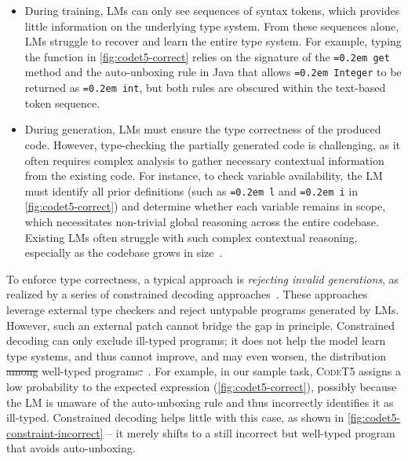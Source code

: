 \documentclass[manuscript,screen]{acmart}
\makeatletter
\newcommand{\toolname}[1]{\textsc{#1}}
\newcommand{\tcode}[1]{{\small \texttt{\spaceskip=0.2em #1}}}
\providecommand{\DIFadd}[1]{{\protect\color{blue}\uwave{#1}}} %
\providecommand{\DIFdel}[1]{{\protect\color{red}\sout{#1}}} %
\providecommand{\DIFaddbegin}{} %
\providecommand{\DIFaddend}{} %
\providecommand{\DIFdelbegin}{} %
\providecommand{\DIFdelend}{} %
\providecommand{\DIFscaledelfig}{0.5}
\newlength{\DIFdelgraphicswidth} %
\newlength{\DIFdelgraphicsheight} %
\providecommand{\DIFaddincludegraphics}[2][]{{\color{blue}\fbox{\DIFOincludegraphics[#1]{#2}}}} %
\providecommand{\DIFdelincludegraphics}[2][]{%
\sbox{\DIFdelgraphicsbox}{\DIFOincludegraphics[#1]{#2}}%
\settoboxwidth{\DIFdelgraphicswidth}{\DIFdelgraphicsbox} %
\settoboxtotalheight{\DIFdelgraphicsheight}{\DIFdelgraphicsbox} %
\scalebox{\DIFscaledelfig}{%
\parbox[b]{\DIFdelgraphicswidth}{\usebox{\DIFdelgraphicsbox}\\[-\baselineskip] \rule{\DIFdelgraphicswidth}{0em}}\llap{\resizebox{\DIFdelgraphicswidth}{\DIFdelgraphicsheight}{%
\setlength{\unitlength}{\DIFdelgraphicswidth}%
\begin{picture}(1,1)%
\thicklines\linethickness{2pt} %
{\color[rgb]{1,0,0}\put(0,0){\framebox(1,1){}}}%
{\color[rgb]{1,0,0}\put(0,0){\line( 1,1){1}}}%
{\color[rgb]{1,0,0}\put(0,1){\line(1,-1){1}}}%
\end{picture}%
}\hspace*{3pt}}} %
} %
\DeclareRobustCommand{\DIFaddbegin}{\DIFOaddbegin \let\includegraphics\DIFaddincludegraphics} %
\DeclareRobustCommand{\DIFaddend}{\DIFOaddend \let\includegraphics\DIFOincludegraphics} %
\DeclareRobustCommand{\DIFdelbegin}{\DIFOdelbegin \let\includegraphics\DIFdelincludegraphics} %
\DeclareRobustCommand{\DIFdelend}{\DIFOaddend \let\includegraphics\DIFOincludegraphics} %
\let\sout@orig\sout %
\renewcommand{\sout}[1]{\ifmmode\text{\sout@orig{\ensuremath{#1}}}\else\sout@orig{#1}\fi} %
\makeatother
\begin{document}
\begin{itemize}
    \item During training, LMs can only see sequences of syntax tokens, which provides little information on the underlying type system. From these sequences alone, LMs struggle to recover and learn the entire type system.
    For example, typing the function in \autoref{fig:codet5-correct} relies on the signature of the \tcode{get} method and the auto-unboxing rule in Java that allows \tcode{Integer} to be returned as \tcode{int}, but both rules are obscured within the text-based token sequence.

    \item During generation, LMs must ensure the type correctness of the produced code. However, type-checking the partially generated code is challenging, as it often requires complex analysis to gather necessary contextual information from the existing code. 
    For instance, to check variable availability, the LM must identify all prior definitions (such as \tcode{l} and \tcode{i} in \autoref{fig:codet5-correct}) and determine whether each variable remains in scope, which necessitates non-trivial global reasoning across the entire codebase. Existing LMs often struggle with such complex contextual reasoning, especially as the codebase grows in size~\cite{guo_2025,DBLP:conf/acl/BaiTZ0WLCX0D0L25}.
\end{itemize}

To enforce type correctness, a typical approach is \emph{rejecting invalid generations}, as realized by a series of {constrained decoding} approaches~\cite{DBLP:conf/sigsoft/0003X023,DBLP:journals/corr/abs-2504-09246}.
These approaches leverage external type checkers and reject untypable programs generated by LMs.
%
However, such an external patch cannot bridge the gap in principle.
%
Constrained decoding can only exclude ill-typed programs; it does not help the model learn type systems, and thus cannot improve, and may even worsen, the distribution \DIFdelbegin \DIFdel{among }\DIFdelend \DIFaddbegin \DIFadd{over }\DIFaddend well-typed programs\DIFdelbegin \DIFdel{.}\DIFdelend ~\cite{DBLP:conf/nips/ParkWBPD24}.
%
For example, in our sample task, \toolname{CodeT5} assigns a low probability to the expected expression (\autoref{fig:codet5-correct}), possibly because the LM is unaware of the auto-unboxing rule and thus incorrectly identifies it as ill-typed.
%
Constrained decoding helps little with this case, as shown in \autoref{fig:codet5-constraint-incorrect} -- it merely shifts to a still incorrect but well-typed program that avoids auto-unboxing.
\end{document}
